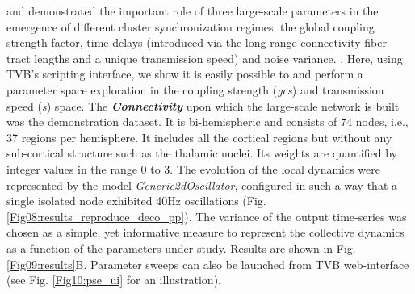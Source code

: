\documentclass{bioinfo}
\newcommand*{\tvbdatatype}[1]{\textbf{\emph{#1}}}   %
\begin{document}

  
    
    \citet{Ghosh_2008} and \citet{Deco_2009} demonstrated the important role
    of three large-scale parameters in the emergence of different cluster
    synchronization regimes: the global coupling strength factor, time-delays
    (introduced via the long-range connectivity fiber tract lengths and a
    unique transmission speed) and noise variance. . Here, using TVB's
    scripting interface, we show it is easily possible to  and perform a parameter space
    exploration in the coupling strength (\emph{gcs}) and transmission speed
    (\emph{s}) space. The \tvbdatatype{Connectivity} upon which the 
    large-scale network is built was the demonstration dataset. It is bi-hemispheric
    and  consists of 74 nodes, i.e., 37 regions per hemisphere. It includes
    all the cortical regions but without any sub-cortical structure such as
    the thalamic nuclei. Its weights are quantified by integer values in the
    range 0 to 3. The evolution of the local dynamics were represented by the
    model \emph{Generic2dOscillator}, configured in such a way that a single
    isolated node exhibited 40Hz oscillations (Fig.
    \ref{Fig08:results_reproduce_deco_pp}). The variance of the output 
    time-series was chosen as a simple, yet informative measure to represent the
    collective dynamics as a function of the parameters under study. Results
    are shown in Fig. \ref{Fig09:results}B. Parameter sweeps can also be
    launched from TVB web-interface (see Fig. \ref{Fig10:pse_ui} for an
    illustration). 

    
\end{document}

